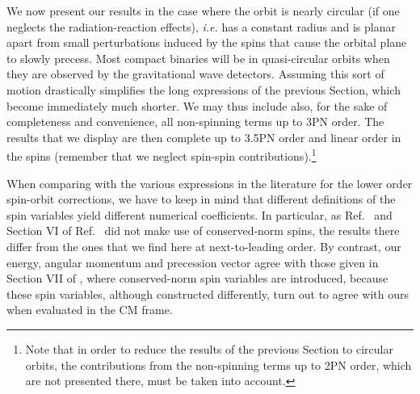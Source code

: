 \documentclass[
superscriptaddress,
preprint,
prd,tightenlines,showpacs,nofootinbib,
eqsecnum,
amsfonts,amsmath,amssymb]{revtex4-1}
\begin{document}
We now present our results in the case where the orbit is nearly
circular (if one neglects the radiation-reaction effects),
\textit{i.e.} has a constant radius and is planar apart from small
perturbations induced by the spins that cause the orbital plane to
slowly precess. Most compact binaries will be in quasi-circular orbits
when they are observed by the gravitational wave detectors. Assuming
this sort of motion drastically simplifies the long expressions of the
previous Section, which become immediately much shorter. We may thus
include also, for the sake of completeness and convenience, all
non-spinning terms up to 3PN order. The results that we display are
then complete up to 3.5PN order and linear order in the spins
(remember that we neglect spin-spin contributions).\footnote{Note that
  in order to reduce the results of the previous Section to circular
  orbits, the contributions from the non-spinning terms up to 2PN
  order, which are not presented there, must be taken into account.}

When comparing with the various expressions in the literature for the
lower order spin-orbit corrections, we have to keep in mind that
different definitions of the spin variables yield different numerical
coefficients. In particular, as Ref.~\cite{Faye2006} and Section VI of
Ref.~\cite{Blanchet2006} did not make use of conserved-norm spins, the
results there differ from the ones that we find here at
next-to-leading order. By contrast, our energy, angular momentum and
precession vector agree with those given in Section VII of
\cite{Blanchet2006}, where conserved-norm spin variables are
introduced, because these spin variables, although constructed
differently, turn out to agree with ours when evaluated in the CM
frame.
\end{document}
